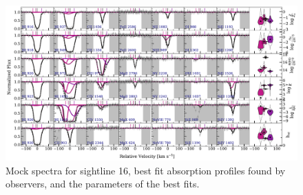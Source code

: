 \documentclass[fleqn,usenatbib]{mnras}
\begin{document}
\begin{figure}
    \centering
    \includegraphics[width=\textwidth]{figures/sample2/best_fits/0016.pdf}
    \caption{
    Mock spectra for sightline 16,
    best fit absorption profiles found by observers,
    and the parameters of the best fits.
    }
    \label{f: sample2 spectrum 16}
\end{figure}
\end{document}
